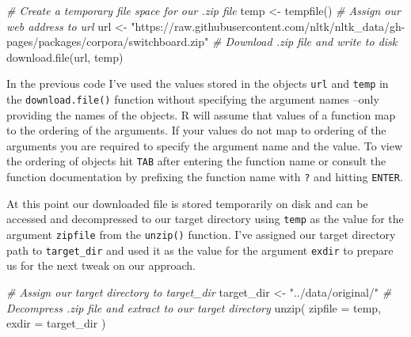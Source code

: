 \documentclass[
  letterpaper,
]{latex/krantz}
\newenvironment{Shaded}{\begin{snugshade}}{\end{snugshade}}
\newcommand{\AttributeTok}[1]{\textcolor[rgb]{0.00,0.00,0.00}{#1}}
\newcommand{\CommentTok}[1]{\textcolor[rgb]{0.00,0.00,0.00}{\textit{#1}}}
\newcommand{\FunctionTok}[1]{\textcolor[rgb]{0.00,0.00,0.00}{#1}}
\newcommand{\NormalTok}[1]{\textcolor[rgb]{0.00,0.00,0.00}{#1}}
\newcommand{\OtherTok}[1]{\textcolor[rgb]{0.00,0.00,0.00}{#1}}
\newcommand{\StringTok}[1]{\textcolor[rgb]{0.00,0.00,0.00}{#1}}
\begin{document}
\begin{Shaded}
\begin{Highlighting}[]
\CommentTok{\# Create a temporary file space for our .zip file}
\NormalTok{temp }\OtherTok{\textless{}{-}} \FunctionTok{tempfile}\NormalTok{()}
\CommentTok{\# Assign our web address to \textasciigrave{}url\textasciigrave{}}
\NormalTok{url }\OtherTok{\textless{}{-}} \StringTok{"https://raw.githubusercontent.com/nltk/nltk\_data/gh{-}pages/packages/corpora/switchboard.zip"}
\CommentTok{\# Download .zip file and write to disk}
\FunctionTok{download.file}\NormalTok{(url, temp)}
\end{Highlighting}
\end{Shaded}

\begin{tcolorbox}[enhanced jigsaw, colframe=quarto-callout-warning-color-frame, titlerule=0mm, coltitle=black, colback=white, opacitybacktitle=0.6, colbacktitle=quarto-callout-warning-color!10!white, left=2mm, arc=.35mm, leftrule=.75mm, rightrule=.15mm, bottomtitle=1mm, toptitle=1mm, breakable, bottomrule=.15mm, title=\textcolor{quarto-callout-warning-color}{\faExclamationTriangle}\hspace{0.5em}{Tip}, toprule=.15mm, opacityback=0]

In the previous code I've used the values stored in the objects
\texttt{url} and \texttt{temp} in the \texttt{download.file()} function
without specifying the argument names --only providing the names of the
objects. R will assume that values of a function map to the ordering of
the arguments. If your values do not map to ordering of the arguments
you are required to specify the argument name and the value. To view the
ordering of objects hit \texttt{TAB} after entering the function name or
consult the function documentation by prefixing the function name with
\texttt{?} and hitting \texttt{ENTER}.

\end{tcolorbox}

At this point our downloaded file is stored temporarily on disk and can
be accessed and decompressed to our target directory using \texttt{temp}
as the value for the argument \texttt{zipfile} from the \texttt{unzip()}
function. I've assigned our target directory path to
\texttt{target\_dir} and used it as the value for the argument
\texttt{exdir} to prepare us for the next tweak on our approach.

\begin{Shaded}
\begin{Highlighting}[]
\CommentTok{\# Assign our target directory to \textasciigrave{}target\_dir\textasciigrave{}}
\NormalTok{target\_dir }\OtherTok{\textless{}{-}} \StringTok{"../data/original/"}
\CommentTok{\# Decompress .zip file and extract to our target directory}
\FunctionTok{unzip}\NormalTok{(}
  \AttributeTok{zipfile =}\NormalTok{ temp,}
  \AttributeTok{exdir =}\NormalTok{ target\_dir}
\NormalTok{)}
\end{Highlighting}
\end{Shaded}
\end{document}
